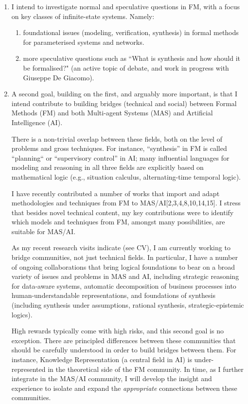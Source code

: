\documentclass[a4paper]{article}
\def\FM{{\sf FM}\xspace}
\def\AI{{\sf AI}\xspace}
\def\MAS{{\sf MAS}\xspace}
\begin{document}
\begin{enumerate}
 \item  I intend to investigate normal and speculative questions in \FM,
with a focus on key classes of infinite-state systems. Namely:
\begin{enumerate}
\item foundational issues (modeling, verification, synthesis) in formal
  methods for parameterised systems and networks. 
\item more speculative questions such as ``What is synthesis and how should it
  be formalised?" (an active topic of debate, and work in progress with Giuseppe De Giacomo).
\end{enumerate}

\item A second goal, building on the first, and arguably more important, is that
I intend contribute to building bridges (technical and social) between Formal Methods (\FM) and both 
Multi-agent Systems (\MAS) and Artificial Intelligence (\AI).

There is a non-trivial overlap between these fields, both on the level of
problems and gross techniques. For instance, ``synthesis'' in \FM is called ``planning`` 
or ``supervisory control'' in \AI; many influential languages for modeling and reasoning in all three fields are 
explicitly based on mathematical logic (e.g., situation calculus, alternating-time temporal
logic).

I have recently contributed a number of works that import and adapt methodologies and techniques from \FM to
\MAS/\AI [2,3,4,8,10,14,15]. I stress that besides novel technical content, 
my key contributions were to identify which models and techniques from \FM, 
amongst many possibilities, are suitable for \MAS/\AI. 

As my recent research visits indicate (see CV), I am currently working to bridge communities, not just technical fields.
In particular, I have a number of ongoing collaborations that bring logical foundations to bear on a 
broad variety of issues and problems in 
\MAS and \AI, including strategic reasoning for data-aware systems, automatic decomposition of 
business processes into human-understandable representations, and foundations of synthesis 
(including synthesis under assumptions, rational synthesis, strategic-epistemic logics). 

High rewards typically come with high risks, and this second goal is no
exception.  There are principled differences between these communities that
should be carefully understood in order to build bridges between them. For instance, Knowledge Representation (a central
field in \AI) is under-represented in the theoretical side of the \FM community. In time, as I further integrate in the \MAS/\AI community, 
I will develop the insight and experience to isolate and expand the \emph{appropriate} connections between these
communities.
\end{enumerate}
\end{document}
